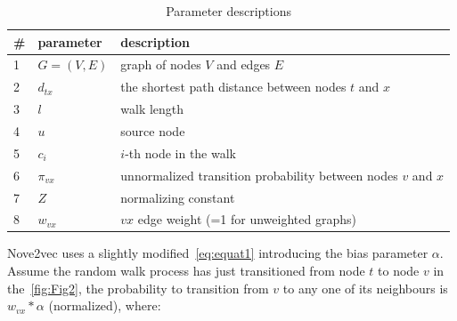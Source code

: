 \begin{table}
\begin{center}
\begin{tabular}{ | m{1em} | m{2cm}| m{11cm} |} 
\hline
\textbf{\#} & \textbf{parameter} & \textbf{description} \\ 
\hline
1 & $G =(V,E)$ & graph of nodes $V$ and edges $E$ \\ 
\hline
2 & $d_{tx}$ & the shortest path distance between nodes $t$ and $x$ \\
\hline
3 & $l$ & walk length \\
\hline
4 & $u$ & source node \\
\hline
5 & $c_i$ & $i$-th node in the walk \\
\hline
6 & $\pi_{vx}$ & unnormalized transition probability between nodes $v$ and $x$ \\
\hline
7 & $Z$ & normalizing constant \\
\hline
8 & $w_{vx}$ & $vx$ edge weight (=1 for unweighted graphs) \\
\hline
\end{tabular}
\caption {Parameter descriptions}
\label{tab:tab1}
\end{center}
\end {table}

Nove2vec uses a slightly modified~\autoref{eq:equat1} introducing the bias parameter $\alpha$. Assume the random walk process has just transitioned from node $t$ to node $v$ in the~\autoref{fig:Fig2}, the probability to transition from $v$ to any one of its neighbours is $w_{vx} *\alpha$ (normalized), where:

